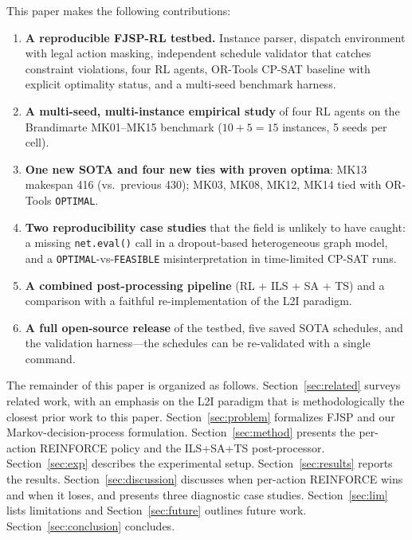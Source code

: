\documentclass[preprint,review,3p,times,twocolumn]{elsarticle}
\begin{document}
This paper makes the following contributions:
\begin{enumerate}[leftmargin=*]
\item \textbf{A reproducible FJSP-RL testbed.} Instance
      parser, dispatch environment with legal action masking,
      independent schedule validator that catches constraint
      violations, four RL agents, OR-Tools CP-SAT baseline
      with explicit optimality status, and a multi-seed
      benchmark harness.
\item \textbf{A multi-seed, multi-instance empirical study}
      of four RL agents on the Brandimarte MK01--MK15
      benchmark ($10 + 5 = 15$ instances, 5 seeds per cell).
\item \textbf{One new SOTA and four new ties with proven
      optima}: MK13 makespan 416 (vs.\ previous 430); MK03,
      MK08, MK12, MK14 tied with OR-Tools \texttt{OPTIMAL}.
\item \textbf{Two reproducibility case studies} that the
      field is unlikely to have caught: a missing
      \texttt{net.eval()} call in a dropout-based
      heterogeneous graph model, and a
      \texttt{OPTIMAL}-vs-\texttt{FEASIBLE}
      misinterpretation in time-limited CP-SAT runs.
\item \textbf{A combined post-processing pipeline} (RL +
      ILS + SA + TS) and a comparison with a faithful
      re-implementation of the L2I paradigm.
\item \textbf{A full open-source release} of the testbed,
      five saved SOTA schedules, and the validation
      harness---the schedules can be re-validated with a
      single command.
\end{enumerate}

The remainder of this paper is organized as follows.
Section~\ref{sec:related} surveys related work, with an
emphasis on the L2I paradigm that is methodologically the
closest prior work to this paper. Section~\ref{sec:problem}
formalizes FJSP and our Markov-decision-process formulation.
Section~\ref{sec:method} presents the per-action REINFORCE
policy and the ILS+SA+TS post-processor. Section~\ref{sec:exp}
describes the experimental setup. Section~\ref{sec:results}
reports the results. Section~\ref{sec:discussion} discusses
when per-action REINFORCE wins and when it loses, and
presents three diagnostic case studies. Section~\ref{sec:lim}
lists limitations and Section~\ref{sec:future} outlines
future work. Section~\ref{sec:conclusion} concludes.

\end{document}

